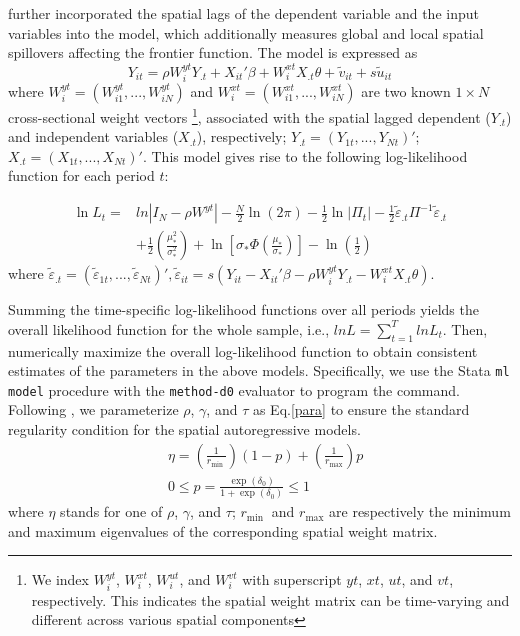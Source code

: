  
\cite{galli2022spatial} further incorporated the spatial lags of the dependent variable and the input variables into the \cite{orea2019new} model, which additionally measures global and local spatial spillovers affecting the frontier function.  The model is expressed as
\begin{equation}\label{gallimodel}
	Y_{it} = \rho W_{i}^{yt}Y_{.t}+X_{it}'\beta+ W_{i}^{xt}X_{.t} \theta + \tilde{v}_{it}+s\tilde{u}_{it}
\end{equation}
where $W_{i}^{yt}=(W_{i1}^{yt},...,W_{iN}^{yt})$ and $W_{i}^{xt}=(W_{i1}^{xt},...,W_{iN}^{xt})$ are two known $1 \times N$ cross-sectional weight vectors \footnote{We index $W_{i}^{yt}$, $W_{i}^{xt}$, $W_{i}^{ut}$, and $W_{i}^{vt}$ with superscript $yt$, $xt$, $ut$, and $vt$, respectively. This indicates the spatial weight matrix can be time-varying and different across various spatial components}, associated with the spatial lagged dependent ($Y_{.t}$) and independent variables ($X_{.t}$), respectively; $Y_{.t} = (Y_{1t},..., Y_{Nt})'$; $X_{.t} = (X_{1t},..., X_{Nt})'$.  This model gives rise to the following log-likelihood function for each period $t$: 

  \begin{equation}\label{gallilik}
	\begin{aligned}
		\ln L_{t}= & ln|I_N - \rho W^{yt}|-\frac{N}{2} \ln (2 \pi)-\frac{1}{2} \ln |\Pi_t|-\frac{1}{2} \tilde{\varepsilon}_{.t} \Pi^{-1} \tilde{\varepsilon}_{.t} \\
		& +\frac{1}{2}\left(\frac{\mu_{*}^{2}}{\sigma_{*}^{2}}\right)+\ln \left[\sigma_{*} \Phi\left(\frac{\mu_{*}}{\sigma_{*}}\right)\right]-\ln \left(\frac{1}{2}\right)
	\end{aligned}
\end{equation}
where $ \tilde{\varepsilon}_{.t} = ( \tilde{\varepsilon}_{1t},..., \tilde{\varepsilon}_{Nt})', \tilde{\varepsilon}_{it}=s(Y_{it}-X_{it}' \beta - \rho W_{i}^{yt}Y_{.t} -W_{i}^{xt}X_{.t} \theta)$. 

Summing the time-specific log-likelihood  functions over all periods yields the overall likelihood function for the whole sample, i.e., $lnL=\sum_{t=1}^TlnL_{t}$. Then, numerically maximize the overall log-likelihood function to obtain consistent estimates of the parameters in the above models.  Specifically, we use the Stata {\tt ml model} procedure with the {\tt method-d0} evaluator to program the  command. Following \cite*{gude2018heterogeneous}, we parameterize $\rho$, $\gamma$, and $\tau$ as Eq.\eqref{para} to ensure the standard regularity condition for the spatial autoregressive models.
\begin{equation}\label{para}
\begin{aligned}
	& \eta=\left(\frac{1}{r_{\text {min }}}\right)(1-p)+\left(\frac{1}{r_{\max }}\right) p \\
	& 0 \leq p=\frac{\exp \left(\delta_0\right)}{1+\exp \left(\delta_0\right)} \leq 1
\end{aligned}
\end{equation}
where $\eta$ stands for one of $\rho$, $\gamma$, and $\tau$;  $r_{\text {min }}$ and $r_{\text {max}}$ are respectively the minimum and maximum eigenvalues of the corresponding spatial weight matrix. 

